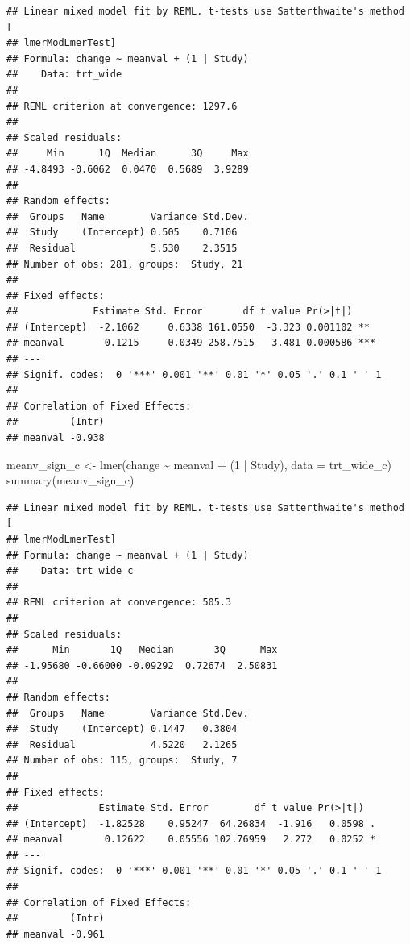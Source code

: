 \documentclass[
]{article}
\newenvironment{Shaded}{\begin{snugshade}}{\end{snugshade}}
\newcommand{\AttributeTok}[1]{\textcolor[rgb]{0.77,0.63,0.00}{#1}}
\newcommand{\DecValTok}[1]{\textcolor[rgb]{0.00,0.00,0.81}{#1}}
\newcommand{\FunctionTok}[1]{\textcolor[rgb]{0.00,0.00,0.00}{#1}}
\newcommand{\NormalTok}[1]{#1}
\newcommand{\OtherTok}[1]{\textcolor[rgb]{0.56,0.35,0.01}{#1}}
\newcommand{\SpecialCharTok}[1]{\textcolor[rgb]{0.00,0.00,0.00}{#1}}
\begin{document}
\begin{verbatim}
## Linear mixed model fit by REML. t-tests use Satterthwaite's method [
## lmerModLmerTest]
## Formula: change ~ meanval + (1 | Study)
##    Data: trt_wide
## 
## REML criterion at convergence: 1297.6
## 
## Scaled residuals: 
##     Min      1Q  Median      3Q     Max 
## -4.8493 -0.6062  0.0470  0.5689  3.9289 
## 
## Random effects:
##  Groups   Name        Variance Std.Dev.
##  Study    (Intercept) 0.505    0.7106  
##  Residual             5.530    2.3515  
## Number of obs: 281, groups:  Study, 21
## 
## Fixed effects:
##             Estimate Std. Error       df t value Pr(>|t|)    
## (Intercept)  -2.1062     0.6338 161.0550  -3.323 0.001102 ** 
## meanval       0.1215     0.0349 258.7515   3.481 0.000586 ***
## ---
## Signif. codes:  0 '***' 0.001 '**' 0.01 '*' 0.05 '.' 0.1 ' ' 1
## 
## Correlation of Fixed Effects:
##         (Intr)
## meanval -0.938
\end{verbatim}

\begin{Shaded}
\begin{Highlighting}[]
\NormalTok{meanv\_sign\_c }\OtherTok{\textless{}{-}} \FunctionTok{lmer}\NormalTok{(change }\SpecialCharTok{\textasciitilde{}}\NormalTok{ meanval }\SpecialCharTok{+}\NormalTok{ (}\DecValTok{1} \SpecialCharTok{|}\NormalTok{ Study), }\AttributeTok{data =}\NormalTok{ trt\_wide\_c)}
\FunctionTok{summary}\NormalTok{(meanv\_sign\_c)}
\end{Highlighting}
\end{Shaded}

\begin{verbatim}
## Linear mixed model fit by REML. t-tests use Satterthwaite's method [
## lmerModLmerTest]
## Formula: change ~ meanval + (1 | Study)
##    Data: trt_wide_c
## 
## REML criterion at convergence: 505.3
## 
## Scaled residuals: 
##      Min       1Q   Median       3Q      Max 
## -1.95680 -0.66000 -0.09292  0.72674  2.50831 
## 
## Random effects:
##  Groups   Name        Variance Std.Dev.
##  Study    (Intercept) 0.1447   0.3804  
##  Residual             4.5220   2.1265  
## Number of obs: 115, groups:  Study, 7
## 
## Fixed effects:
##              Estimate Std. Error        df t value Pr(>|t|)  
## (Intercept)  -1.82528    0.95247  64.26834  -1.916   0.0598 .
## meanval       0.12622    0.05556 102.76959   2.272   0.0252 *
## ---
## Signif. codes:  0 '***' 0.001 '**' 0.01 '*' 0.05 '.' 0.1 ' ' 1
## 
## Correlation of Fixed Effects:
##         (Intr)
## meanval -0.961
\end{verbatim}
\end{document}
